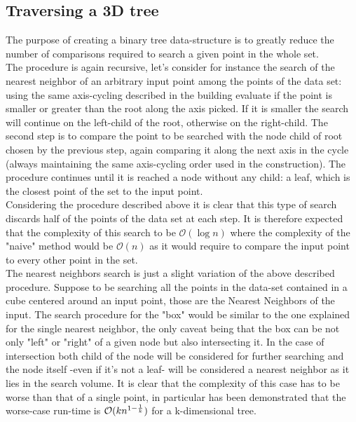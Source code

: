 \subsection{Traversing a 3D tree}
The purpose of creating a binary tree data-structure is to greatly reduce the number of comparisons required to search a given point in the whole set.\\
The procedure is again recursive, let's consider for instance the search of the nearest neighbor of an arbitrary input point among the points of the data set: using the same axis-cycling described in the building evaluate if the point is smaller or greater than the root along the axis picked. If it is smaller the search will continue on the left-child of the root, otherwise on the right-child. The second step is to compare the point to be searched with the node child of root chosen by the previous step, again comparing it along the next axis in the cycle (always maintaining the same axis-cycling order used in the construction). The procedure continues until it is reached a node without any child: a leaf, which is the closest point of the set to the input point.\\
Considering the procedure described above it is clear that this type of search discards half of the points of the data set at each step. It is therefore expected that the complexity of this search to be $\mathcal{O}(\log{} n)$ where the complexity of the "naive" method would be $\mathcal{O}(n)$ as it would require to compare the input point to every other point in the set.\\
The nearest neighbors search is just a slight variation of the above described procedure. Suppose to be searching all the points in the data-set contained in a cube centered around an input point, those are the Nearest Neighbors of the input. The search procedure for the "box" would be similar to the one explained for the single nearest neighbor, the only caveat being that the box can be not only "left" or "right" of a given node but also intersecting it. In the case of intersection both child of the node will be considered for further searching and the node itself -even if it's not a leaf- will be considered a nearest neighbor as it lies in the search volume. It is clear that the complexity of this case has to be worse than that of a single point, in particular has been demonstrated \cite{worst-case-search} that the worse-case run-time is $\mathcal{O}(k n ^{1 - {1\over k}})$ for a k-dimensional tree.

